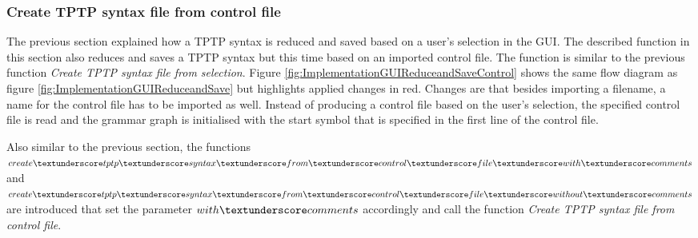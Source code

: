 \subsubsection{Create \ac{TPTP} syntax file from control file}\label{sec:ImplementationGUICreateTPTPFromControlfile}

The previous section explained how a \ac{TPTP} syntax is reduced and saved based on a user's selection in the GUI.
The described function in this section also reduces and saves a \ac{TPTP} syntax but this time based on an imported control file.
The function is similar to the previous function \textit{Create \ac{TPTP} syntax file from selection}.
Figure \ref{fig:ImplementationGUIReduceandSaveControl} shows the same flow diagram as figure \ref{fig:ImplementationGUIReduceandSave} but highlights applied changes in red.
Changes are that besides importing a filename, a name for the control file has to be imported as well.
Instead of producing a control file based on the user's selection, the specified control file is read and the grammar graph is initialised with the start symbol that is specified in the first line of the control file.

Also similar to the previous section, the functions \\ $create\textunderscore tptp\textunderscore syntax\textunderscore from\textunderscore control\textunderscore file\textunderscore with\textunderscore comments$ and \\
$create\textunderscore tptp\textunderscore syntax\textunderscore from\textunderscore control\textunderscore file\textunderscore without\textunderscore comments$ are introduced that set the parameter $with\textunderscore comments$ accordingly and call the function \textit{Create \ac{TPTP} syntax file from control file}.

